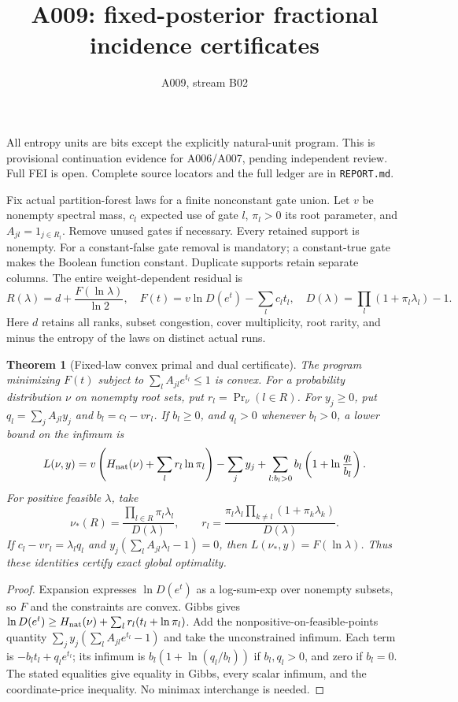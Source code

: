 \documentclass[11pt]{article}
\newtheorem{theorem}{Theorem}
\begin{document}
\title{A009: fixed-posterior fractional incidence certificates}
\author{A009, stream B02}\maketitle
All entropy units are bits except the explicitly natural-unit program.
This is provisional continuation evidence for A006/A007, pending independent
review. Full FEI is open. Complete source locators and the full ledger are
in \texttt{REPORT.md}.

Fix actual partition-forest laws for a finite nonconstant gate union.
Let $v$ be nonempty spectral mass, $c_l$ expected use of gate $l$,
$\pi_l>0$ its root parameter, and $A_{jl}=1_{j\in R_l}$.
Remove unused gates if necessary. Every retained support is nonempty.
For a constant-false gate removal is mandatory; a constant-true gate makes
the Boolean function constant. Duplicate supports retain separate columns.
The entire weight-dependent residual is
\[
 R(\lambda)=d+\frac{F(\ln\lambda)}{\ln2},\quad
 F(t)=v\ln D(e^t)-\sum_lc_lt_l,\quad
 D(\lambda)=\prod_l(1+\pi_l\lambda_l)-1.
\]
Here $d$ retains all ranks, subset congestion, cover multiplicity, root
rarity, and minus the entropy of the laws on distinct actual runs.

\begin{theorem}[Fixed-law convex primal and dual certificate]
The program minimizing $F(t)$ subject to
$\sum_l A_{jl}e^{t_l}\le1$ is convex. For a probability distribution $\nu$
on nonempty root sets, put $r_l=\Pr_\nu(l\in R)$. For $y_j\ge0$, put
$q_l=\sum_j A_{jl}y_j$ and $b_l=c_l-vr_l$. If $b_l\ge0$, and
$q_l>0$ whenever $b_l>0$, a lower bound on the infimum is
\[
 L(\nu,y)=v\left(H_{\rm nat}(\nu)+\sum_lr_l\ln\pi_l\right)
 -\sum_jy_j+\sum_{l:b_l>0}b_l\left(1+\ln\frac{q_l}{b_l}\right).
\]
For positive feasible $\lambda$, take
\[
 \nu_*(R)=\frac{\prod_{l\in R}\pi_l\lambda_l}{D(\lambda)},\qquad
 r_l=\frac{\pi_l\lambda_l\prod_{k\ne l}(1+\pi_k\lambda_k)}{D(\lambda)}.
\]
If $c_l-vr_l=\lambda_lq_l$ and
$y_j(\sum_l A_{jl}\lambda_l-1)=0$, then $L(\nu_*,y)=F(\ln\lambda)$.
Thus these identities certify exact global optimality.
\end{theorem}
\begin{proof}
Expansion expresses $\ln D(e^t)$ as a log-sum-exp over nonempty subsets,
so $F$ and the constraints are convex. Gibbs gives
$\ln D(e^t)\ge H_{\rm nat}(\nu)+\sum_l r_l(t_l+\ln\pi_l)$.
Add the nonpositive-on-feasible-points quantity
$\sum_jy_j(\sum_l A_{jl}e^{t_l}-1)$ and take the unconstrained infimum.
Each term is $-b_lt_l+q_le^{t_l}$; its infimum is
$b_l(1+\ln(q_l/b_l))$ if $b_l,q_l>0$, and zero if $b_l=0$.
The stated equalities give equality in Gibbs, every scalar infimum, and
the coordinate-price inequality. No minimax interchange is needed.
\end{proof}
\end{document}
